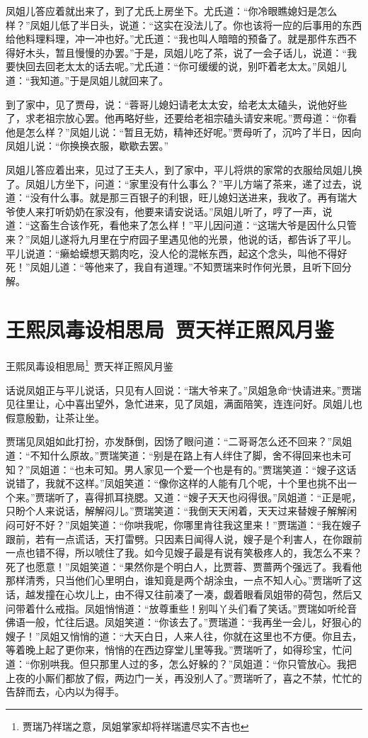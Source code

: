 \documentclass[12pt,oneside]{book}
\begin{document}
凤姐儿答应着就出来了，到了尤氏上房坐下。尤氏道：“你冷眼瞧媳妇是怎么样？”凤姐儿低了半日头，说道：“这实在没法儿了。你也该将一应的后事用的东西给他料理料理，冲一冲也好。”尤氏道：“我也叫人暗暗的预备了。就是那件东西不得好木头，暂且慢慢的办罢。”于是，凤姐儿吃了茶，说了一会子话儿，说道：“我要快回去回老太太的话去呢。”尤氏道：“你可缓缓的说，别吓着老太太。”凤姐儿道：“我知道。”于是凤姐儿就回来了。

到了家中，见了贾母，说：“蓉哥儿媳妇请老太太安，给老太太磕头，说他好些了，求老祖宗放心罢。他再略好些，还要给老祖宗磕头请安来呢。”贾母道：“你看他是怎么样？”凤姐儿说：“暂且无妨，精神还好呢。”贾母听了，沉吟了半日，因向凤姐儿说：“你换换衣服，歇歇去罢。”

凤姐儿答应着出来，见过了王夫人，到了家中，平儿将烘的家常的衣服给凤姐儿换了。凤姐儿方坐下，问道：“家里没有什么事么？”平儿方端了茶来，递了过去，说道：“没有什么事。就是那三百银子的利银，旺儿媳妇送进来，我收了。再有瑞大爷使人来打听奶奶在家没有，他要来请安说话。”凤姐儿听了，哼了一声，说道：“这畜生合该作死，看他来了怎么样！”平儿因问道：“这瑞大爷是因什么只管来？”凤姐儿遂将九月里在宁府园子里遇见他的光景，他说的话，都告诉了平儿。平儿说道：“癞蛤蟆想天鹅肉吃，没人伦的混帐东西，起这个念头，叫他不得好死！”凤姐儿道：“等他来了，我自有道理。”不知贾瑞来时作何光景，且听下回分解。

 
\chapter{王熙凤毒设相思局~贾天祥正照风月鉴}
王熙凤毒设相思局\footnote{贾瑞乃祥瑞之意，凤姐掌家却将祥瑞遣尽实不吉也}~贾天祥正照风月鉴

话说凤姐正与平儿说话，只见有人回说：“瑞大爷来了。”凤姐急命“快请进来。”贾瑞见往里让，心中喜出望外，急忙进来，见了凤姐，满面陪笑，连连问好。凤姐儿也假意殷勤，让茶让坐。

贾瑞见凤姐如此打扮，亦发酥倒，因饧了眼问道：“二哥哥怎么还不回来？”凤姐道：“不知什么原故。”贾瑞笑道：“别是在路上有人绊住了脚，舍不得回来也未可知？”凤姐道：“也未可知。男人家见一个爱一个也是有的。”贾瑞笑道：“嫂子这话说错了，我就不这样。”凤姐笑道：“像你这样的人能有几个呢，十个里也挑不出一个来。”贾瑞听了，喜得抓耳挠腮。又道：“嫂子天天也闷得很。”凤姐道：“正是呢，只盼个人来说话，解解闷儿。”贾瑞笑道：“我倒天天闲着，天天过来替嫂子解解闲闷可好不好？”凤姐笑道：“你哄我呢，你哪里肯往我这里来！”贾瑞道：“我在嫂子跟前，若有一点谎话，天打雷劈。只因素日闻得人说，嫂子是个利害人，在你跟前一点也错不得，所以唬住了我。如今见嫂子最是有说有笑极疼人的，我怎么不来？死了也愿意！”凤姐笑道：“果然你是个明白人，比贾蓉、贾蔷两个强远了。我看他那样清秀，只当他们心里明白，谁知竟是两个胡涂虫，一点不知人心。”贾瑞听了这话，越发撞在心坎儿上，由不得又往前凑了一凑，觑着眼看凤姐带的荷包，然后又问带着什么戒指。凤姐悄悄道：“放尊重些！别叫丫头们看了笑话。”贾瑞如听纶音佛语一般，忙往后退。凤姐笑道：“你该去了。”贾瑞道：“我再坐一会儿，好狠心的嫂子！”凤姐又悄悄的道：“大天白日，人来人往，你就在这里也不方便。你且去，等着晚上起了更你来，悄悄的在西边穿堂儿里等我。”贾瑞听了，如得珍宝，忙问道：“你别哄我。但只那里人过的多，怎么好躲的？”凤姐道：“你只管放心。我把上夜的小厮们都放了假，两边门一关，再没别人了。”贾瑞听了，喜之不禁，忙忙的告辞而去，心内以为得手。
\end{document}
